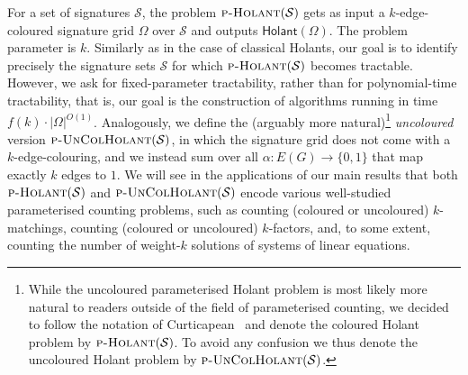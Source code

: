 \documentclass[authorcolumns,numberwithinsect]{no-lipics-v2022}
\newcommand{\holantprob}{\text{\sc{p-Holant}}}
\newcommand{\holant}{\mathsf{Holant}}
\begin{document}
For a set of signatures $\mathcal{S}$, the problem $\holantprob(\mathcal{S})$ gets as input a $k$-edge-coloured signature grid $\Omega$ over $\mathcal{S}$ and outputs $\holant(\Omega)$. The problem parameter is $k$. Similarly as in the case of classical Holants, our goal is to identify precisely the signature sets $\mathcal{S}$ for which $\holantprob(\mathcal{S})$ becomes tractable. However, we ask for fixed-parameter tractability, rather than for polynomial-time tractability, that is, our goal is the construction of algorithms running in time $f(k)\cdot |\Omega|^{O(1)}$. Analogously, we define the (arguably more natural)\footnote{While the uncoloured parameterised Holant problem is most likely more natural to readers outside of the field of parameterised counting, we decided to follow the notation of Curticapean~\cite{Curticapean15} and denote the coloured Holant problem by $\holantprob(\mathcal{S})$. To avoid any confusion we thus denote the uncoloured Holant problem by $\text{\sc{p-UnColHolant}}(\mathcal{S})$.} \emph{uncoloured} version $\text{\sc{p-UnColHolant}}(\mathcal{S})$, in which the signature grid does not come with a $k$-edge-colouring, and we instead sum over all $\alpha:E(G)\to\{0,1\}$ that map exactly $k$ edges to $1$. We will see in the applications of our main results that both $\holantprob(\mathcal{S})$ and $\text{\sc{p-UnColHolant}}(\mathcal{S})$ encode various well-studied parameterised counting problems, such as counting (coloured or uncoloured) $k$-matchings, counting (coloured or uncoloured) $k$-factors, and, to some extent, counting the number of weight-$k$ solutions of systems of linear equations.
\end{document}
